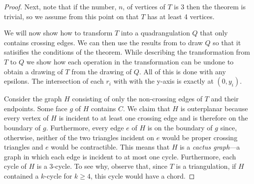 \documentclass{patmorin}
\begin{document}
\begin{proof}
   Next,  note that if the number, $n$, of vertices of $T$ is 3 then
   the theorem is trivial, so we assume from this point on that $T$
   has at least 4 vertices.

   We will now show how to transform $T$ into a quadrangulation $Q$
   that only contains crossing edges.  We can then use the results from
    to draw $Q$ so that it satisifies the conditions of
   the theorem.  While describing the transformation from $T$ to $Q$ we
   show how each operation in the transformation can be undone to obtain
   a drawing of $T$ from the drawing of $Q$.  All of this is done with
   any epsilons. The intersection of each $r_i$ with with the y-axis is
   exactly at $(0,y_i)$.

   Consider the graph $H$ consisting of only the non-crossing edges of $T$
   and their endpoints.  Some face $g$ of $H$ contains $C$.  We claim
   that $H$ is outerplanar because every vertex of $H$ is incident to
   at least one crossing edge and is therefore on the boundary of $g$.
   Furthermore, every edge $e$ of $H$ is on the boundary of $g$ since,
   otherwise, neither of the two triangles incident on $e$ would be proper
   crossing triangles and $e$ would be contractible.  This means that
   $H$ is a \emph{cactus graph}---a graph in which each edge is incident
   to at most one cycle.  Furthermore, each cycle of $H$ is a 3-cycle.
   To see why, observe that, since $T$ is a triangulation, if $H$
   contained a $k$-cycle for $k\ge 4$, this cycle would have a chord.


\end{proof}
\end{document}
